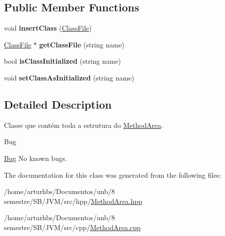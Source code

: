 \subsection*{Public Member Functions}
\begin{DoxyCompactItemize}
\item 
void {\bfseries insert\+Class} (\hyperlink{classClassFile}{Class\+File})\hypertarget{classMethodArea_acbed0fac7a8faddb9db077d2db371975}{}\label{classMethodArea_acbed0fac7a8faddb9db077d2db371975}

\item 
\hyperlink{classClassFile}{Class\+File} $\ast$ {\bfseries get\+Class\+File} (string name)\hypertarget{classMethodArea_adb24ecb911e16d944bcc6f08c8b6d456}{}\label{classMethodArea_adb24ecb911e16d944bcc6f08c8b6d456}

\item 
bool {\bfseries is\+Class\+Initialized} (string name)\hypertarget{classMethodArea_a87c8ddc94c3e15227978b83bfa30aa13}{}\label{classMethodArea_a87c8ddc94c3e15227978b83bfa30aa13}

\item 
void {\bfseries set\+Class\+As\+Initialized} (string name)\hypertarget{classMethodArea_a983834bb0ba6196b094ef91e0843da16}{}\label{classMethodArea_a983834bb0ba6196b094ef91e0843da16}

\end{DoxyCompactItemize}


\subsection{Detailed Description}
Classe que contém toda a estrutura do \hyperlink{classMethodArea}{Method\+Area}. 

\begin{DoxyRefDesc}{Bug}
\item[\hyperlink{bug__bug000031}{Bug}]No known bugs. \end{DoxyRefDesc}


The documentation for this class was generated from the following files\+:\begin{DoxyCompactItemize}
\item 
/home/arturhbs/\+Documentos/unb/8 semestre/\+S\+B/\+J\+V\+M/src/hpp/\hyperlink{MethodArea_8hpp}{Method\+Area.\+hpp}\item 
/home/arturhbs/\+Documentos/unb/8 semestre/\+S\+B/\+J\+V\+M/src/cpp/\hyperlink{MethodArea_8cpp}{Method\+Area.\+cpp}\end{DoxyCompactItemize}
